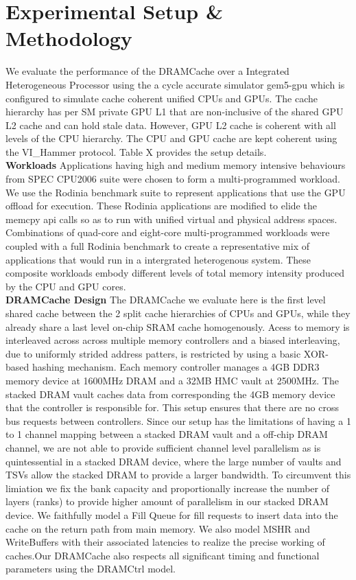 \section{Experimental Setup \& Methodology} \label{methodology}
We evaluate the performance of the DRAMCache over a Integrated Heterogeneous Processor using the a cycle accurate simulator gem5-gpu \cite{gem5-gpu} which is configured to simulate cache coherent unified CPUs and GPUs. The cache hierarchy has per SM private GPU L1  that are non-inclusive of the shared GPU L2 cache and can hold stale data. However, GPU L2 cache is coherent with all levels of the CPU hierarchy. The CPU and GPU cache are kept coherent using the VI\_Hammer protocol. Table X provides the setup details.\\
\textbf{Workloads} Applications having high and medium memory intensive behaviours from SPEC CPU2006 suite \cite{spec2006} were chosen to form a multi-programmed workload. We use the Rodinia benchmark suite \cite{rodinia} to represent applications that use the GPU offload for execution. These Rodinia applications are modified to elide the memcpy api calls so as to run with unified virtual and physical address spaces. Combinations of quad-core and eight-core multi-programmed workloads were coupled with a full Rodinia benchmark to create a representative mix of applications that would run in a intergrated heterogenous system. These composite workloads embody different levels of total memory intensity produced by the CPU and GPU cores. \\
\textbf{DRAMCache Design} The DRAMCache we evaluate here is the first level shared cache between the 2 split cache hierarchies of CPUs and GPUs, while they already share a last level on-chip SRAM cache homogenously. Acess to memory is interleaved across across multiple memory controllers and a biased interleaving, due to uniformly strided address patters, is restricted by using a basic XOR-based hashing mechanism. Each memory controller manages a 4GB DDR3 memory device at 1600MHz DRAM and a 32MB HMC vault at 2500MHz. The stacked DRAM vault caches data from corresponding the 4GB memory device that the controller is responsible for. This setup ensures that there are no cross bus requests between controllers. Since our setup has the limitations of having a 1 to 1 channel mapping between a stacked DRAM vault and a off-chip DRAM channel, we are not able to provide sufficient channel level parallelism as is quintessential in a stacked DRAM device, where the large number of vaults and TSVs allow the stacked DRAM to provide a larger bandwidth. To circumvent this limiation we fix the bank capacity and proportionally increase the number of layers (ranks) to provide higher amount of parallelism in our stacked DRAM device. We faithfully model a Fill Queue \cite{dca} for fill requests to insert data into the cache on the return path from main memory. We also model MSHR and WriteBuffers with their associated latencies to realize the precise working of caches.Our DRAMCache also respects all significant timing and functional parameters using the DRAMCtrl \cite{dramctrl} model. \\
